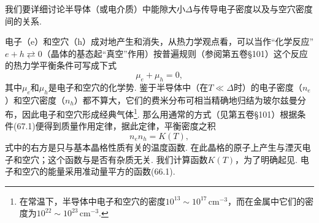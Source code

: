 我们要详细讨论半导体（或电介质）中能隙大小$\Delta$与传导电子密度以及与空穴密度间的关系.

电子（e）和空穴（h）成对地产生和消失，从热力学观点看，可以当作“化学反应”$e+h\rightleftarrows0$（晶体的基态起“真空”作用）按普遍规则（参阅第五卷§101）这个反应的热力学平衡条件可写成下式
\begin{equation}
\mu_e+\mu_h=0,
\end{equation}
其中$\mu_e$和$\mu_h$是电子和空穴的化学势. 鉴于半导体中（在$T\ll\Delta$时）的电子密度（$n_e$）和空穴密度（$n_h$）都不算大，它们的费米分布可相当精确地归结为玻尔兹曼分布，因此电子和空穴形成经典气体\footnote{在常温下，半导体中电子和空穴的密度$10^{13}\sim10^{17}\,\mathrm{cm}^{-3}$，而在金属中它们的密度为$10^{22}\sim10^{23}\,\mathrm{cm}^{-3}$.}. 那么用通常的方式（见第五卷§101）根据条件(67.1)便得到质量作用定律，据此定律，平衡密度之积
\begin{equation}
n_en_h=K(T),
\end{equation}
式中的右方是只与基本晶格性质有关的温度函数. 在此晶格的原子上产生与湮灭电子和空穴；这个函数与是否有杂质无关. 我们计算函数$K(T)$，为了明确起见. 电子和空穴的能量采用准动量平方的函数(66.1).

